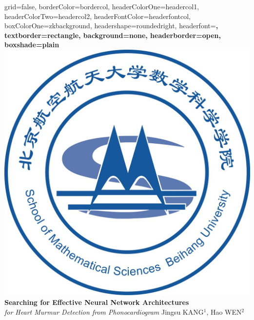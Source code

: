\documentclass[a0paper,portrait]{baposter}
\begin{document}

\begin{poster}{
grid=false,
borderColor=bordercol, %
headerColorOne=headercol1, %
headerColorTwo=headercol2, %
headerFontColor=headerfontcol, %
boxColorOne=zkbackground,
headershape=roundedright, %
headerfont=\Large\sf\bf, %
textborder=rectangle,
background=none,
headerborder=open, %
boxshade=plain
}
%
%
{\includegraphics[scale=0.090]{logo_buaa_math.jpg}} %
{
{\bf \fontsize{19pt}{19pt} \selectfont Searching for Effective Neural Network Architectures} \\
{\it \LARGE  for Heart Murmur Detection from Phonocardiogram}
} %
{\vspace{0.3em} \smaller Jingsu KANG$^1$, Hao WEN$^2$  \\  %

}
\end{poster}
\end{document}
